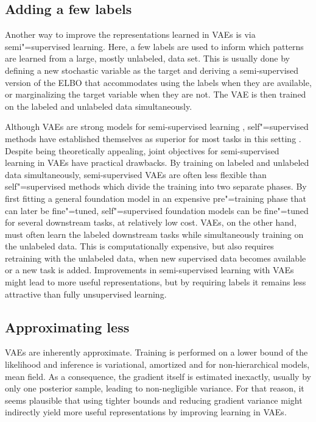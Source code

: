 \subsection{Adding a few labels} 
Another way to improve the representations learned in VAEs is via semi"=supervised learning. 
Here, a few labels are used to inform which patterns are learned from a large, mostly unlabeled, data set. 
This is usually done by defining a new stochastic variable as the target and deriving a semi-supervised version of the ELBO that accommodates using the labels when they are available, or marginalizing the target variable when they are not. The VAE is then trained on the labeled and unlabeled data simultaneously. 

Although VAEs are strong models for semi-supervised learning \parencite{kingma_semi-supervised_2014,kingma_improved_2016,maaloe_biva_2019}, self"=supervised methods have established themselves as superior for most tasks in this setting \cite{baevski_wav2vec_2020,jiang_speech_2021, liu_learning_2023}. 
Despite being theoretically appealing, joint objectives for semi-supervised learning in VAEs have practical drawbacks. By training on labeled and unlabeled data simultaneously, semi-supervised VAEs are often less flexible than self"=supervised methods which divide the training into two separate phases. By first fitting a general foundation model in an expensive pre"=training phase that can later be fine"=tuned, self"=supervised foundation models can be fine"=tuned for several downstream tasks, at relatively low cost. 
VAEs, on the other hand, must often learn the labeled downstream tasks while simultaneously training on the unlabeled data. This is computationally expensive, but also requires retraining with the unlabeled data, when new supervised data becomes available or a new task is added. Improvements in semi-supervised learning with VAEs might lead to more useful representations, but by requiring labels it remains less attractive than fully unsupervised learning.


\subsection{Approximating less}
VAEs are inherently approximate. Training is performed on a lower bound of the likelihood and inference is variational, amortized and for non-hierarchical models, mean field. As a consequence, the gradient itself is estimated inexactly, usually by only one posterior sample, leading to non-negligible variance. 
For that reason, it seems plausible that using tighter bounds and reducing gradient variance might indirectly yield more useful representations by improving learning in VAEs. 

